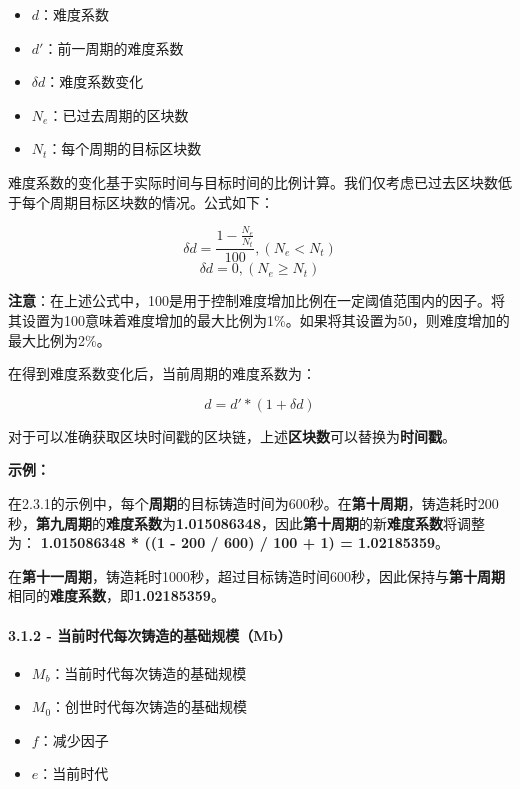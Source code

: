 \documentclass[
]{article}
\providecommand{\tightlist}{%
  \setlength{\itemsep}{0pt}\setlength{\parskip}{0pt}}
\begin{document}
\begin{itemize}
\tightlist
\item
  \(d\)：难度系数
\item
  \(d'\)：前一周期的难度系数
\item
  \(\delta d\)：难度系数变化
\item
  \(N_e\)：已过去周期的区块数
\item
  \(N_t\)：每个周期的目标区块数
\end{itemize}

难度系数的变化基于实际时间与目标时间的比例计算。我们仅考虑已过去区块数低于每个周期目标区块数的情况。公式如下：

\begin{equation}
\delta d = \frac{1-\frac{N_e}{N_t}}{100},(N_e < N_t)
\end{equation} \begin{equation}
\delta d = 0,(N_e \geq N_t)
\end{equation}

\textbf{注意}：在上述公式中，100是用于控制难度增加比例在一定阈值范围内的因子。将其设置为100意味着难度增加的最大比例为1\%。如果将其设置为50，则难度增加的最大比例为2\%。

在得到难度系数变化后，当前周期的难度系数为：

\begin{equation}
d = d' * (1 + \delta d)
\end{equation}

对于可以准确获取区块时间戳的区块链，上述\textbf{区块数}可以替换为\textbf{时间戳}。

\textbf{示例：}

在2.3.1的示例中，每个\textbf{周期}的目标铸造时间为600秒。在\textbf{第十周期}，铸造耗时200秒，\textbf{第九周期}的\textbf{难度系数}为\textbf{1.015086348}，因此\textbf{第十周期}的新\textbf{难度系数}将调整为：
\textbf{1.015086348 * ((1 - 200 / 600) / 100 + 1) = 1.02185359}。

在\textbf{第十一周期}，铸造耗时1000秒，超过目标铸造时间600秒，因此保持与\textbf{第十周期}相同的\textbf{难度系数}，即\textbf{1.02185359}。

\paragraph{3.1.2 -
当前时代每次铸造的基础规模（Mb）}\label{ux5f53ux524dux65f6ux4ee3ux6bcfux6b21ux94f8ux9020ux7684ux57faux7840ux89c4ux6a21mb}

\begin{itemize}
\tightlist
\item
  \(M_b\)：当前时代每次铸造的基础规模
\item
  \(M_0\)：创世时代每次铸造的基础规模
\item
  \(f\)：减少因子
\item
  \(e\)：当前时代
\end{itemize}
\end{document}
